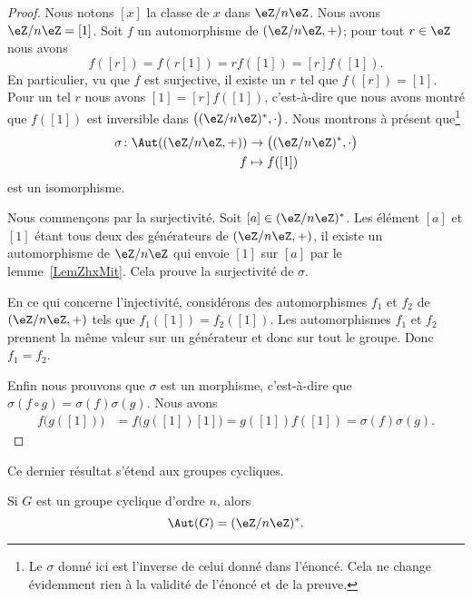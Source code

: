 \begin{proof}
    Nous notons \( [x]\) la classe de \( x\) dans \( \eZ/n\eZ\). Nous avons \( \eZ/n\eZ=[1]\). Soit \( f\) un automorphisme de \( (\eZ/n\eZ,+)\); pour tout \( r\in \eZ\) nous avons
    \begin{equation}
        f([r])=f(r[1])=rf([1])=[r]f([1]).
    \end{equation}
En particulier, vu que \( f\) est surjective, il existe un \( r\) tel que \( f([r])=[1]\). Pour un tel \( r\) nous avons \( [1]=[r]f([1])\), c'est-à-dire que nous avons montré que \( f([1])\) est inversible dans \(  \big( (\eZ/n\eZ)^*,\cdot\big)\). Nous montrons à présent que\footnote{Le \( \sigma\) donné ici est l'inverse de celui donné dans l'énoncé. Cela ne change évidemment rien à la validité de l'énoncé et de la preuve.}
    \begin{equation}
        \begin{aligned}
            \sigma\colon \Aut( (\eZ/n\eZ,+))&\to \big( (\eZ/n\eZ)^*,\cdot \big)\\
            f&\mapsto f([1])
        \end{aligned}
    \end{equation}
    est un isomorphisme.

    Nous commençons par la surjectivité. Soit \( [a]\in (\eZ/n\eZ)^*\). Les élément \( [a]\) et \( [1]\) étant tous deux des générateurs de \( (\eZ/n\eZ,+)\), il existe un automorphisme de \( \eZ/n\eZ\) qui envoie \( [1]\) sur \( [a]\) par le lemme~\ref{LemZhxMit}. Cela prouve la surjectivité de \( \sigma\).

    En ce qui concerne l'injectivité, considérons des automorphismes \( f_1\) et \( f_2\) de \( (\eZ/n\eZ,+)\) tels que \( f_1([1])=f_2([1])\). Les automorphismes \( f_1\) et \( f_2\) prennent la même valeur sur un générateur et donc sur tout le groupe. Donc \( f_1=f_2\).

    Enfin nous prouvons que \( \sigma\) est un morphisme, c'est-à-dire que \( \sigma(f\circ g)=\sigma(f)\sigma(g)\). Nous avons
    \begin{subequations}
        \begin{align}
            f\big( g([1]) \big)&=f\big( g([1])[1] \big)=g([1])f([1])=\sigma(f)\sigma(g).
        \end{align}
    \end{subequations}
\end{proof}

Ce dernier résultat s'étend aux groupes cycliques.
\begin{proposition}
    Si \( G\) est un groupe cyclique d'ordre \( n\), alors
    \begin{equation}
        \Aut(G)=(\eZ/n\eZ)^*.
    \end{equation}
\end{proposition}

